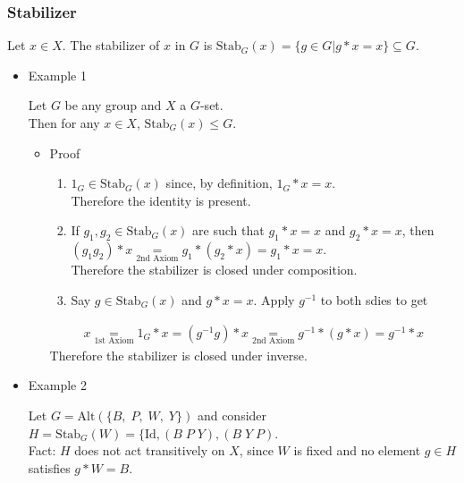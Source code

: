 \documentclass[11pt]{article}
\newcommand{\0}{\emptyset}
\begin{document}
\subsubsection*{Stabilizer}
\label{sec:orgd131226}
Let \(x\in X\). The stabilizer of \(x\) in \(G\) is \(\text{Stab}_{G}(x)=\{g\in G|g*x=x\}\subseteq G\).\\[0pt]
\begin{itemize}
\item Example 1
\label{sec:org5dcf118}

Let \(G\) be any group and \(X\) a \(G\)-set.\\[0pt]
Then for any \(x\in X\), \(\text{Stab}_{G}(x)\leq G\).\\[0pt]
\begin{itemize}
\item Proof
\label{sec:org83e5d7f}

\begin{enumerate}
\item \(1_{G}\in\text{Stab}_{G}(x)\) since, by definition, \(1_{G}*x=x\).\\[0pt]
Therefore the identity is present.\\[0pt]
\item If \(g_{1},g_{2}\in\text{Stab}_{G}(x)\) are such that \(g_{1}*x=x\) and \(g_{2}*x=x\), then \((g_{1}g_{2})*x\underset{\text{2nd Axiom}}{=}g_{1}*(g_{2}*x)=g_{1}*x=x\).\\[0pt]
Therefore the stabilizer is closed under composition.\\[0pt]
\item Say \(g\in\text{Stab}_{G}(x)\) and \(g*x=x\). Apply \(g^{-1}\) to both sdies to get\\[0pt]
\end{enumerate}
\begin{align*}
  x\underset{\text{1st Axiom}}{=}1_{G}*x=(g^{-1}g)*x\underset{\text{2nd Axiom}}{=}g^{-1}*(g*x)=g^{-1}*x
\end{align*}
Therefore the stabilizer is closed under inverse.\\[0pt]
\end{itemize}
\item Example 2
\label{sec:org59e61fd}

Let \(G=\text{Alt}(\{B,\;P,\;W,\;Y\})\) and consider \(H=\text{Stab}_{G}(W)=\{\text{Id},(B\;P\;Y),(B\;Y\;P)\).\\[0pt]
Fact: \(H\) does not act transitively on \(X\), since \(W\) is fixed and no element \(g\in H\) satisfies \(g*W=B\).\\[0pt]
\end{itemize}
\end{document}
